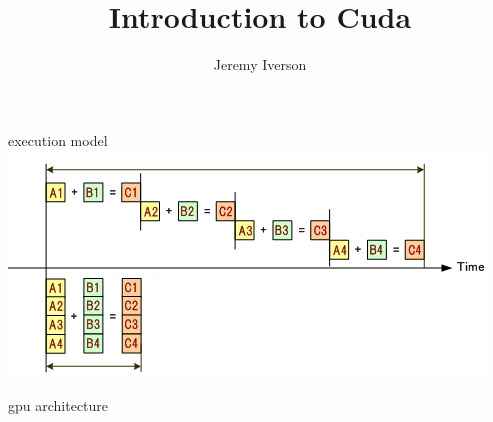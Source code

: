 \documentclass[10pt,t]{beamer}
\title{Introduction to Cuda}
\date{}
\author{Jeremy Iverson}
\institute{College of Saint Benedict \& Saint John's University}
\begin{document}
  \maketitle

  \begin{frame}{execution model}
    \includegraphics[width=\textwidth]{simd-execution.png}\\
  \end{frame}

  \begin{frame}{gpu architecture}
  \end{frame}
\end{document}
